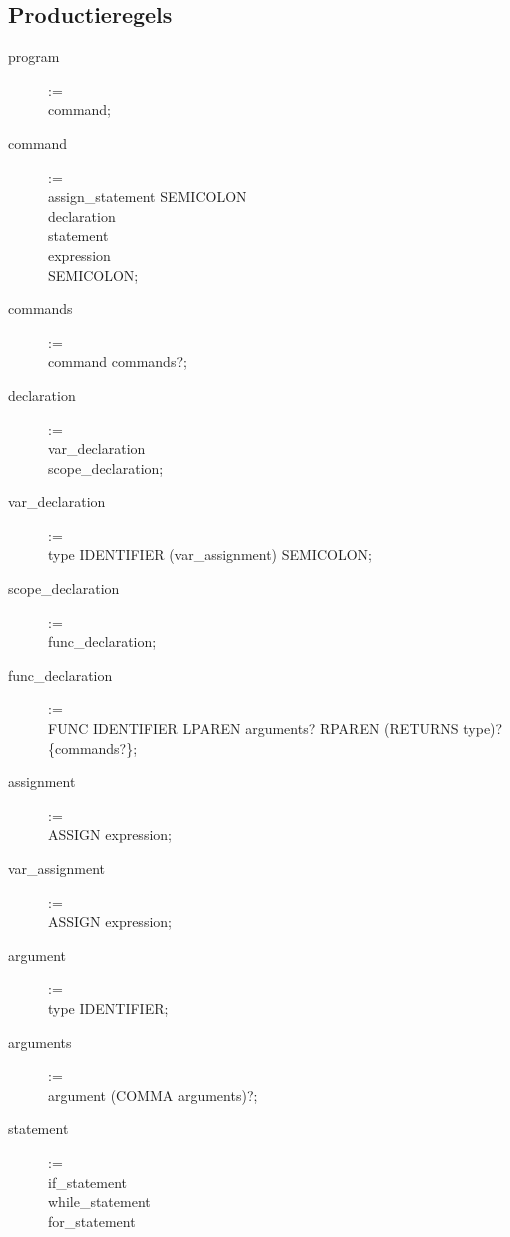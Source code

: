 \subsection{Productieregels} %
\label{sub:productieregels}
\begin{description}
    \item[program] := \hfill \\
        command;
    \item[command] := \hfill \\
        assign\_statement SEMICOLON \textbar \\
        declaration \textbar \\
        statement \textbar \\
        expression \textbar \\
        SEMICOLON;
    \item[commands] := \hfill \\
        command commands?;
    \item[declaration] := \hfill \\
        var\_declaration \textbar \\
        scope\_declaration;
    \item[var\_declaration] := \hfill \\
        type IDENTIFIER (var\_assignment) SEMICOLON;
    \item[scope\_declaration] := \hfill \\
        func\_declaration;
    \item[func\_declaration] := \hfill \\
        FUNC IDENTIFIER LPAREN arguments? RPAREN (RETURNS type)? \{commands?\};
    \item[assignment] := \hfill \\
        ASSIGN expression;
    \item[var\_assignment] := \hfill \\
        ASSIGN expression;
    \item[argument] := \hfill \\
        type IDENTIFIER;
    \item[arguments] := \hfill \\
        argument (COMMA arguments)?;
    \item[statement] := \hfill \\
        if\_statement \textbar \\ 
        while\_statement \textbar \\
        for\_statement \textbar \\

\end{description}
